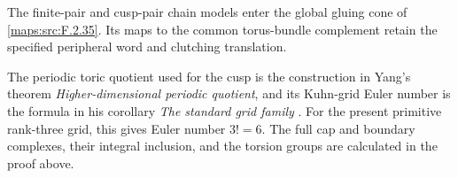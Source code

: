 \documentclass[11pt,a4paper]{article}
\theoremstyle{definition}
\begin{document}
The finite-pair and cusp-pair chain models enter the global
gluing cone of \cref{maps:src:F.2.35}. Its maps to the common
torus-bundle complement retain the specified peripheral word
and clutching translation.

The periodic toric quotient used for the cusp is the construction in
Yang's theorem \emph{Higher-dimensional periodic quotient}, and its
Kuhn-grid Euler number is the formula in his corollary
\emph{The standard grid family}
\cite[Theorem 8.7, pp.~57--59, and Corollary 8.8, p.~59, attached source build]{manYang26}.
For the present primitive rank-three grid, this gives Euler number
$3!=6$.  The full cap and boundary complexes, their integral inclusion,
and the torsion groups are calculated in the proof above.
\end{document}
